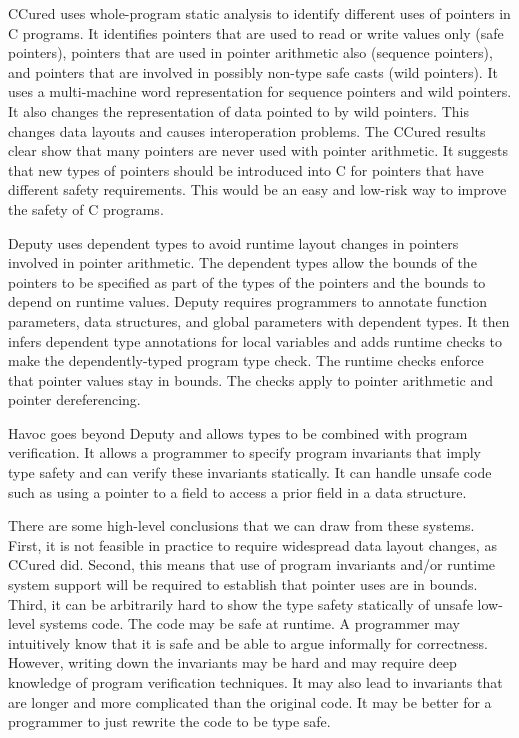 \documentclass[]{article}
\begin{document}
CCured uses whole-program static analysis to identify different uses of
pointers in C programs. It identifies pointers that are used to read or
write values only (safe pointers), pointers that are used in pointer
arithmetic also (sequence pointers), and pointers that are involved in
possibly non-type safe casts (wild pointers). It uses a multi-machine
word representation for sequence pointers and wild pointers. It also
changes the representation of data pointed to by wild pointers. This
changes data layouts and causes interoperation problems. The CCured
results clear show that many pointers are never used with pointer
arithmetic. It suggests that new types of pointers should be introduced
into C for pointers that have different safety requirements. This would
be an easy and low-risk way to improve the safety of C programs.

Deputy uses dependent types to avoid runtime layout changes in pointers
involved in pointer arithmetic. The dependent types allow the bounds of
the pointers to be specified as part of the types of the pointers and
the bounds to depend on runtime values. Deputy requires programmers to
annotate function parameters, data structures, and global parameters
with dependent types. It then infers dependent type annotations for
local variables and adds runtime checks to make the dependently-typed
program type check. The runtime checks enforce that pointer values stay
in bounds. The checks apply to pointer arithmetic and pointer
dereferencing.

Havoc goes beyond Deputy and allows types to be combined with program
verification. It allows a programmer to specify program invariants that
imply type safety and can verify these invariants statically. It can
handle unsafe code such as using a pointer to a field to access a prior
field in a data structure.

There are some high-level conclusions that we can draw from these
systems. First, it is not feasible in practice to require widespread
data layout changes, as CCured did. Second, this means that use of
program invariants and/or runtime system support will be required to
establish that pointer uses are in bounds. Third, it can be arbitrarily
hard to show the type safety statically of unsafe low-level systems
code. The code may be safe at runtime. A programmer may intuitively know
that it is safe and be able to argue informally for correctness.
However, writing down the invariants may be hard and may require deep
knowledge of program verification techniques. It may also lead to
invariants that are longer and more complicated than the original code.
It may be better for a programmer to just rewrite the code to be type
safe.
\end{document}
